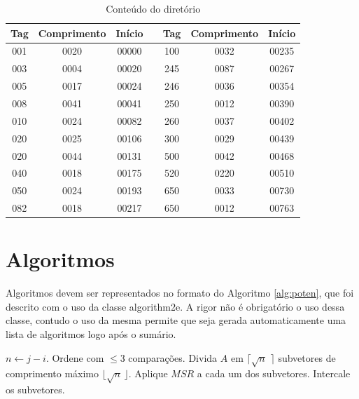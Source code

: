 \begin{table}[hp]
  \centering
  \caption{Conteúdo do diretório \cite{Mar2004}}
  \label{tab:MarcMNem} 
  \begin{tabular}{|c|c|c|c|c|c|c|}
    \hline Tag & Comprimento & Início &  & Tag & Comprimento & Início \\
    \hline 001 & 0020        & 00000  &  & 100 & 0032        & 00235  \\
    \hline 003 & 0004        & 00020  &  & 245 & 0087        & 00267  \\
    \hline 005 & 0017        & 00024  &  & 246 & 0036        & 00354  \\
    \hline 008 & 0041        & 00041  &  & 250 & 0012        & 00390  \\
    \hline 010 & 0024        & 00082  &  & 260 & 0037        & 00402  \\
    \hline 020 & 0025        & 00106  &  & 300 & 0029        & 00439  \\
    \hline 020 & 0044        & 00131  &  & 500 & 0042        & 00468  \\
    \hline 040 & 0018        & 00175  &  & 520 & 0220        & 00510  \\
    \hline 050 & 0024        & 00193  &  & 650 & 0033        & 00730  \\
    \hline 082 & 0018        & 00217  &  & 650 & 0012        & 00763  \\
    \hline 
  \end{tabular} 
\end{table}

\section{Algoritmos}\label{sec:algor} 

Algoritmos devem ser representados no formato do Algoritmo \ref{alg:poten}, que
foi descrito com o uso da classe \textsf{algorithm2e}. A rigor não é
obrigatório o uso dessa classe, contudo o uso da mesma permite que seja gerada
automaticamente uma lista de algoritmos logo após o sumário.

\medskip
\begin{center}
  \begin{minipage}{0.92\textwidth}
    \begin{algorithm2e}[H]
      \dontprintsemicolon
      \linesnumbered
      \SetLine
      \BlankLine
      \BlankLine
      $n \leftarrow j - i$.\;
      {Ordene com $\leq 3$ comparações.}
      {Divida $A$ em $\lceil\sqrt{n}\,\,\rceil$ subvetores de comprimento máximo $\lfloor\sqrt{n}\,\rfloor$.\;
      Aplique $MSR$ a cada um dos subvetores.\;
      Intercale os subvetores.\;}
      \caption{$MSR(A,i,j)$
      \label{alg:poten}}
    \end{algorithm2e}
  \end{minipage}
\end{center}

